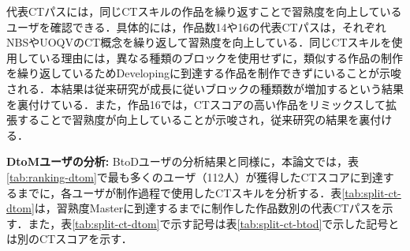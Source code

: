 \documentclass[submit,ses,noauthor]{ipsj}
\begin{document}
代表CTパスには，同じCTスキルの作品を繰り返すことで習熟度を向上しているユーザを確認できる．具体的には，作品数14や16の代表CTパスは，それぞれNBSやUOQVのCT概念を繰り返して習熟度を向上している．同じCTスキルを使用している理由には，異なる種類のブロックを使用せずに，類似する作品の制作を繰り返しているためDevelopingに到達する作品を制作できずにいることが示唆される．本結果は従来研究\cite{Yang_2015}が成長に従いブロックの種類数が増加するという結果を裏付けている．また，作品16では，CTスコアの高い作品をリミックスして拡張することで習熟度が向上していることが示唆され，従来研究\cite{Yang_2015}の結果を裏付ける．




\noindent\textbf{DtoMユーザの分析: }BtoDユーザの分析結果と同様に，本論文では，表\ref{tab:ranking-dtom}で最も多くのユーザ（112人）が獲得したCTスコアに到達するまでに，各ユーザが制作過程で使用したCTスキルを分析する．表\ref{tab:split-ct-dtom}は，習熟度Masterに到達するまでに制作した作品数別の代表CTパスを示す．また，表\ref{tab:split-ct-dtom}で示す記号は表\ref{tab:split-ct-btod}で示した記号とは別のCTスコアを示す．%
\end{document}

